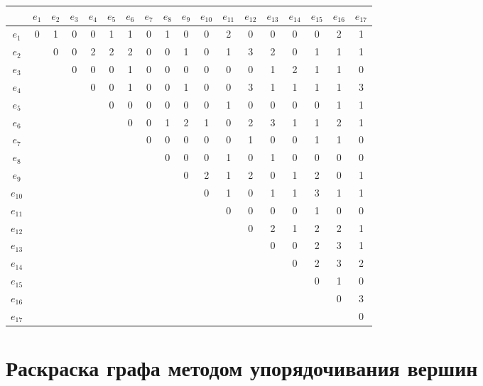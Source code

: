 \documentclass[12pt, a4paper] {ncc}
\begin{document}
\begin{tabular}{|c|c|c|c|c|c|c|c|c|c|c|c|c|c|c|c|c|c|}
\hline
      & $e_{1}$ & $e_{2}$ & $e_{3}$ & $e_{4}$ & $e_{5}$ & $e_{6}$ & $e_{7}$ & $e_{8}$ & $e_{9}$ & $e_{10}$ & $e_{11}$ & $e_{12}$ & $e_{13}$ & $e_{14}$ & $e_{15}$ & $e_{16}$ & $e_{17}$ \\
\hline
$e_{1}$  & 0 & 1&0&0&1&1&0&1&0&0&2&0&0&0&0&2&1\\ \hline
$e_{2}$  &   & 0&0&2&2&2&0&0&1&0&1&3&2&0&1&1&1\\ \hline
$e_{3}$  &   &  &0&0&0&1&0&0&0&0&0&0&1&2&1&1&0\\ \hline
$e_{4}$  &   &  & &0&0&1&0&0&1&0&0&3&1&1&1&1&3\\ \hline
$e_{5}$  &   &  & & &0&0&0&0&0&0&1&0&0&0&0&1&1\\ \hline
$e_{6}$  &   &  & & & &0&0&1&2&1&0&2&3&1&1&2&1\\ \hline
$e_{7}$  &   &  & & & & &0&0&0&0&0&1&0&0&1&1&0\\ \hline
$e_{8}$  &   &  & & & & & &0&0&0&1&0&1&0&0&0&0\\ \hline
$e_{9}$  &   &  & & & & & & &0&2&1&2&0&1&2&0&1\\ \hline
$e_{10}$ &   &  & & & & & & & &0&1&0&1&1&3&1&1\\ \hline
$e_{11}$ &   &  & & & & & & & & &0&0&0&0&1&0&0\\ \hline
$e_{12}$ &   &  & & & & & & & & & &0&2&1&2&2&1\\ \hline
$e_{13}$ &   &  & & & & & & & & & & &0&0&2&3&1\\ \hline
$e_{14}$ &   &  & & & & & & & & & & & &0&2&3&2\\ \hline
$e_{15}$ &   &  & & & & & & & & & & & & &0&1&0\\ \hline
$e_{16}$ &   &  & & & & & & & & & & & & & &0&3\\ \hline
$e_{17}$ &   &  & & & & & & & & & & & & & & &0\\ \hline
\end{tabular}

\section{Раскраска графа методом упорядочивания вершин}
\end{document}
